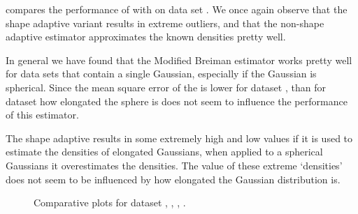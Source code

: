  compares the performance of \mbe with \sambe on data set \numberstringnum{\baakmanFiveNum}. We once again observe that the shape adaptive variant results in extreme outliers, and that the non-shape adaptive estimator approximates the known densities pretty well. 


In general we have found that the Modified Breiman estimator works pretty well for data sets that contain a single Gaussian, especially if the Gaussian is spherical. Since the mean square error of the \mbe is lower for dataset \baakmanFive, than for dataset \baakmanFour how elongated the sphere is does not seem to influence the performance of this estimator. 

The shape adaptive \mbe results in some extremely high and low values if it is used to estimate the densities of elongated Gaussians, when applied to a spherical Gaussians it overestimates the densities. The value of these extreme `densities' does not seem to be influenced by how elongated the Gaussian distribution is.


\begin{figure*}
	\centering
	
	\caption{Comparative plots for dataset \ferdosiTwo, \ferdosiThree, \baakmanTwo, \baakmanThree.}
	\label{fig:4:resuts:multiSphere}
\end{figure*}

